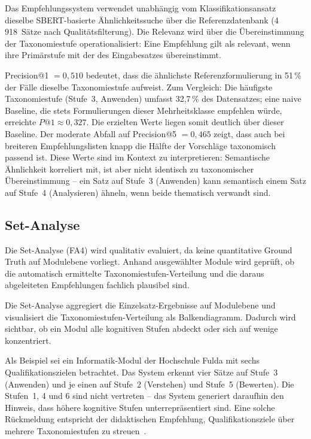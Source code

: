 Das Empfehlungssystem verwendet unabhängig vom Klassifikationsansatz dieselbe SBERT-basierte Ähnlichkeitssuche über die Referenzdatenbank (4\,918~Sätze nach Qualitätsfilterung).
Die Relevanz wird über die Übereinstimmung der Taxonomiestufe operationalisiert: Eine Empfehlung gilt als relevant, wenn ihre Primärstufe mit der des Eingabesatzes übereinstimmt.

Precision@1 $= 0{,}510$ bedeutet, dass die ähnlichste Referenzformulierung in 51\,\% der Fälle dieselbe Taxonomiestufe aufweist.
Zum Vergleich: Die häufigste Taxonomiestufe (Stufe~3, Anwenden) umfasst 32{,}7\,\% des Datensatzes; eine naive Baseline, die stets Formulierungen dieser Mehrheitsklasse empfehlen würde, erreichte $P@1 \approx 0{,}327$.
Die erzielten Werte liegen somit deutlich über dieser Baseline.
Der moderate Abfall auf Precision@5 $= 0{,}465$ zeigt, dass auch bei breiteren Empfehlungslisten knapp die Hälfte der Vorschläge taxonomisch passend ist.
Diese Werte sind im Kontext zu interpretieren: Semantische Ähnlichkeit korreliert mit, ist aber nicht identisch zu taxonomischer Übereinstimmung -- ein Satz auf Stufe~3 (Anwenden) kann semantisch einem Satz auf Stufe~4 (Analysieren) ähneln, wenn beide thematisch verwandt sind.

\subsection{Set-Analyse}\label{sec:eval-set}

Die Set-Analyse (FA4) wird qualitativ evaluiert, da keine quantitative Ground Truth auf Modulebene vorliegt.
Anhand ausgewählter Module wird geprüft, ob die automatisch ermittelte Taxonomiestufen-Verteilung und die daraus abgeleiteten Empfehlungen fachlich plausibel sind.

Die Set-Analyse aggregiert die Einzelsatz-Ergebnisse auf Modulebene und visualisiert die Taxonomiestufen-Verteilung als Balkendiagramm.
Dadurch wird sichtbar, ob ein Modul alle kognitiven Stufen abdeckt oder sich auf wenige konzentriert.

Als Beispiel sei ein Informatik-Modul der Hochschule Fulda mit sechs Qualifikationszielen betrachtet.
Das System erkennt vier Sätze auf Stufe~3 (Anwenden) und je einen auf Stufe~2 (Verstehen) und Stufe~5 (Bewerten).
Die Stufen~1, 4 und 6 sind nicht vertreten -- das System generiert daraufhin den Hinweis, dass höhere kognitive Stufen unterrepräsentiert sind.
Eine solche Rückmeldung entspricht der didaktischen Empfehlung, Qualifikationsziele über mehrere Taxonomiestufen zu streuen~\cite{anderson2001taxonomy}.

